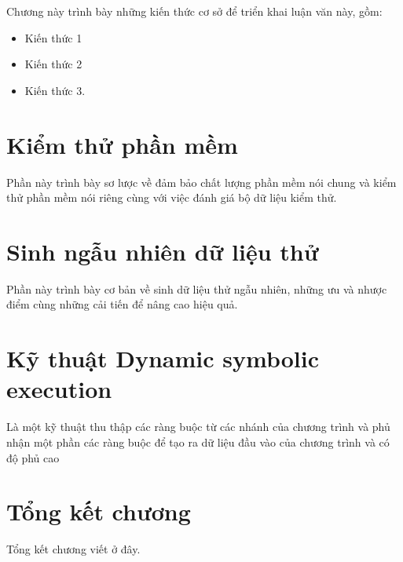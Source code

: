 Chương này trình bày những kiến thức cơ sở để triển khai luận văn này, gồm:
\begin{itemize}
\item Kiến thức 1
\item Kiến thức 2
\item Kiến thức 3.
\end{itemize}

\section{Kiểm thử phần mềm}

Phần này trình bày sơ lược về đảm bảo chất lượng phần mềm nói chung và kiểm thử phần mềm nói riêng cùng với việc đánh giá bộ dữ liệu kiểm thử.

\section{Sinh ngẫu nhiên dữ liệu thử}

Phần này trình bày cơ bản về sinh dữ liệu thử ngẫu nhiên, những ưu và nhược điểm cùng những cải tiến để nâng cao hiệu quả.

\section{Kỹ thuật Dynamic symbolic execution}

Là một kỹ thuật thu thập các ràng buộc từ các nhánh của chương trình
và phủ nhận một phần các ràng buộc để tạo ra dữ liệu đầu vào của
chương trình và có độ phủ cao

\section*{Tổng kết chương}

Tổng kết chương viết ở đây.

